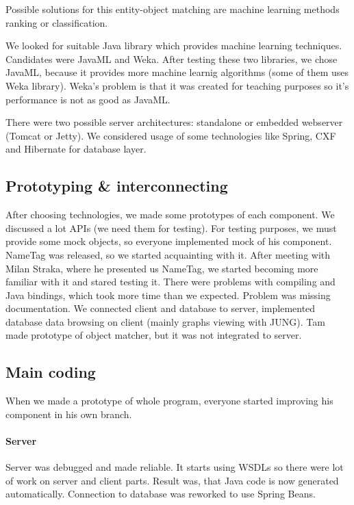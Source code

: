 Possible solutions for this entity-object matching are machine learning  methods
ranking or classification.

We looked for suitable Java library which provides machine learning techniques.
Candidates were JavaML and Weka. After testing these two libraries, we chose
JavaML, because it provides more machine learnig algorithms (some of them uses
Weka library). Weka's problem is that it was created for teaching purposes so
it's performance is not as good as JavaML.

There were two possible server architectures: standalone or embedded webserver
(Tomcat or Jetty). We considered usage of some technologies like Spring, CXF and
Hibernate for database layer.

\subsection{Prototyping \& interconnecting}
After choosing technologies, we made some prototypes of each component. We
discussed a lot APIs (we need them for testing). For testing purposes, we must
provide some mock objects, so everyone implemented mock of his component.
NameTag was released, so we started acquainting with it. After meeting with Milan Straka, where he presented us NameTag, we started becoming more familiar with it and stared testing it.
There were problems with compiling and Java bindings, which took more time than we expected. Problem was missing documentation.
We connected client and database to server, implemented database data browsing on client (mainly graphs viewing with JUNG).
Tam made prototype of object matcher, but it was not integrated to server.

\subsection{Main coding}
When we made a prototype of whole program, everyone started improving his component in his own branch.
\paragraph{Server} Server was debugged and made reliable. It starts using WSDLs so there were lot of work on server and client parts. Result was, that Java code is now generated automatically. Connection to database was reworked to use Spring Beans.
